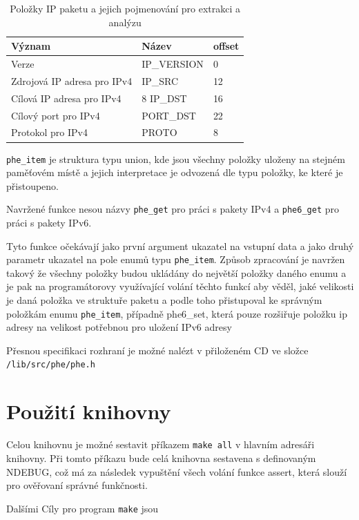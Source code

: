 \begin{table}[!htbp]
	\center
	\label{tab:phe}
    \begin{tabular}{|l|l|l|}
    \hline
    Význam & Název & offset \\ \hline
    Verze & IP\_VERSION & 0 \\ \hline
    Zdrojová IP adresa pro IPv4 & IP\_SRC & 12 \\ \hline
    Cílová IP adresa pro IPv4 & 8 IP\_DST & 16 \\ \hline
    Cílový port pro IPv4 & PORT\_DST & 22 \\ \hline
    Protokol pro IPv4 & PROTO & 8 \\ \hline
    \end{tabular}
	\caption{Položky IP paketu a jejich pojmenování pro extrakci a analýzu}
\end{table}

\texttt{phe\_item} je struktura typu union, kde jsou všechny položky uloženy na stejném paměťovém místě
a jejich interpretace je odvozená dle typu položky, ke které je přistoupeno.

Navržené funkce nesou názvy \texttt{phe\_get} pro práci s pakety IPv4 a \texttt{phe6\_get}
pro práci s pakety IPv6.

Tyto funkce očekávají jako první argument ukazatel na vstupní data a jako druhý parametr
ukazatel na pole enumů typu \texttt{phe\_item}. Způsob zpracování je navržen takový
že všechny položky budou ukládány do největší položky daného enumu a je pak na programátorovy
využívající volání těchto funkcí aby věděl, jaké velikosti je daná položka ve struktuře paketu
a podle toho přistupoval ke správným položkám enumu \texttt{phe\_item}, případně phe6\_set,
která pouze rozšiřuje položku ip adresy na velikost potřebnou pro uložení IPv6 adresy

Přesnou specifikaci rozhraní je možné nalézt v přiloženém CD ve složce \texttt{/lib/src/phe/phe.h}


\section{Použití knihovny} %
Celou knihovnu je možné sestavit příkazem \texttt{make all} v hlavním adresáři knihovny.
Při tomto příkazu bude celá knihovna sestavena s definovaným NDEBUG, což má za následek vypuštění všech
volání funkce assert, která slouží pro ověřovaní správné funkčnosti.

Dalšími Cíly pro program \texttt{make} jsou

